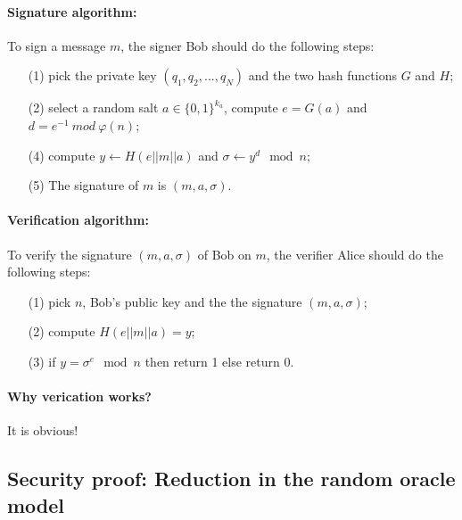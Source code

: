 \documentclass[a4paper,11pt]{article}
\begin{document}
\paragraph{Signature algorithm:}


\label{signature1} To sign a message $m$, the signer Bob should do
the following steps:
\begin{itemize}
\item[\rm(1)]    pick the private key $(q_1,q_2,...,q_N)$ and the two hash functions $G$ and $H$;

\item[\rm(2)]    select a random salt $a\in \{0,1\}^{k_a}$, compute $e=G(a)$ and $d=e^{-1} \ mod \ \varphi(n)$;

\item[\rm(4)]   compute    $y\longleftarrow H(e||m||a)$ and $\sigma\longleftarrow y^d \mod n$;

\item[\rm(5)]   The signature of $m$ is   $(m,a,\sigma)$.
\end{itemize}

 \vspace{0.2cm}

\paragraph{Verification algorithm:}

\label{verification1}

 To verify the signature $(m,a,\sigma) $  of Bob on $m$, the verifier Alice should do the following steps:

\begin{itemize}
\item[\rm(1)]   pick $n$, Bob's public key and the the signature $(m,a,\sigma) $;
\item [\rm(2)]compute $H(e||m||a)=y$;

\item[\rm(3)] if $y=\sigma^e \mod n$ then return 1 else return 0.

\end{itemize}


\paragraph{Why verication works?}  It is obvious!

\subsection{Security proof: Reduction in the random oracle model}\label{sec:three:2}
\end{document}
